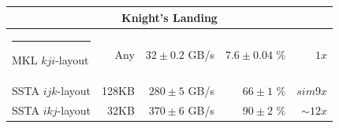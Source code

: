 \documentclass{sig-alternate-05-2015}
\makeatletter
\newcommand{\thickhline}{%
    \noalign {\ifnum 0=`}\fi \hrule height 1pt
    \futurelet \reserved@a \@xhline
}
\makeatother
\begin{document}
\begin{table}[t]
\begin{tabular}{|l|r|r|r|r|}
    \multicolumn{5}{c}{\rule{0pt}{2.25ex} \textbf{Knight's Landing}} \\ \hline \thickhline
    MKL \(kji\)-layout  &   Any &\(32 \pm 0.2\) GB/s&\(7.6 \pm 0.04\) \%& \(1x\) \\ \hline
    SSTA \(ijk\)-layout & 128KB &\(280 \pm 5\) GB/s&\(66 \pm 1\) \%& \(sim 9x\) \\ \hline
    SSTA \(ikj\)-layout &  32KB &\(370 \pm 6\) GB/s&\(90 \pm 2\) \%& \(\sim 12x\) \\ \hline
  \end{tabular}
  \label{tab:results:comparison}
\end{table}

\end{document}

